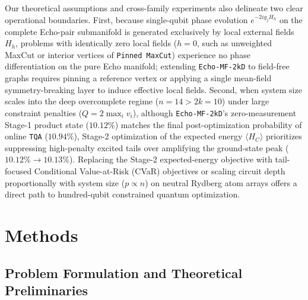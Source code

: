 \documentclass[10pt,a4paper]{article}
\begin{document}
Our theoretical assumptions and cross-family experiments also delineate two clear operational boundaries. First, because single-qubit phase evolution $e^{-2i g_j H_h}$ on the complete Echo-pair submanifold is generated exclusively by local external fields $H_h$, problems with identically zero local fields ($h = 0$, such as unweighted MaxCut or interior vertices of \texttt{Pinned MaxCut}) experience no phase differentiation on the pure Echo manifold; extending \texttt{Echo-MF-2kD} to field-free graphs requires pinning a reference vertex or applying a single mean-field symmetry-breaking layer to induce effective local fields. Second, when system size scales into the deep overcomplete regime ($n = 14 > 2k = 10$) under large constraint penalties ($Q = 2\max_i v_i$), although \texttt{Echo-MF-2kD}'s zero-measurement Stage-1 product state ($10.12\%$) matches the final post-optimization probability of online \texttt{TQA} ($10.94\%$), Stage-2 optimization of the expected energy $\langle H_C \rangle$ prioritizes suppressing high-penalty excited tails over amplifying the ground-state peak ($10.12\% \rightarrow 10.13\%$). Replacing the Stage-2 expected-energy objective with tail-focused Conditional Value-at-Risk (CVaR) objectives or scaling circuit depth proportionally with system size ($p \propto n$) on neutral Rydberg atom arrays offers a direct path to hundred-qubit constrained quantum optimization.


\section*{Methods}

\subsection*{Problem Formulation and Theoretical Preliminaries}
\end{document}
